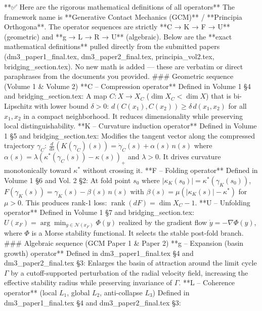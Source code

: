 **✅ Here are the rigorous mathematical definitions of all operators**
The framework name is **Generative Contact Mechanics (GCM)** / **Principia Orthogona**.
The operator sequences are strictly **C → K → F → U** (geometric) and **g → L → R → U** (algebraic).
Below are the **exact mathematical definitions** pulled directly from the submitted papers (dm3_paper1_final.tex, dm3_paper2_final.tex, principia_vol2.tex, bridging_section.tex). No new math is added — these are verbatim or direct paraphrases from the documents you provided.
### Geometric sequence (Volume 1 & Volume 2)
**C – Compression operator**
Defined in Volume 1 §4 and bridging_section.tex:
A map $  C: X \to X_C  $ ($  \dim X_C < \dim X  $) that is bi-Lipschitz with lower bound $  \delta > 0  $:
$   d(C(x_1), C(x_2)) \ge \delta \, d(x_1, x_2)   $
for all $  x_1, x_2  $ in a compact neighborhood. It reduces dimensionality while preserving local distinguishability.
**K – Curvature induction operator**
Defined in Volume 1 §5 and bridging_section.tex:
Modifies the tangent vector along the compressed trajectory $  \gamma_C  $:
$   \frac{d}{ds} (K(\gamma_C)(s)) = \dot{\gamma}_C(s) + \alpha(s) \, n(s)   $
where $  \alpha(s) = \lambda (\kappa^*(\gamma_C(s)) - \kappa(s))_+  $ and $  \lambda > 0  $.
It drives curvature monotonically toward $  \kappa^*  $ without crossing it.
**F – Folding operator**
Defined in Volume 1 §6 and Vol. 2 §2:
At fold point $  s_0  $ where $  |\kappa_K(s_0)| = \kappa^*(\gamma_K(s_0))  $,
$   F(\gamma_K(s)) = \gamma_K(s) - \beta(s) \, n(s)   $
with $  \beta(s) = \mu (|\kappa_K(s)| - \kappa^*)  $ for $  \mu > 0  $.
This produces rank-1 loss: $  \operatorname{rank}(dF) = \dim X_C - 1  $.
**U – Unfolding operator**
Defined in Volume 1 §7 and bridging_section.tex:
$   U(x_F) = \arg\min_{y \in \mathcal{N}(x_F)} \Phi(y)   $
realized by the gradient flow $  \dot{y} = -\nabla \Phi(y)  $, where $  \Phi  $ is a Morse stability functional. It selects the stable post-fold branch.
### Algebraic sequence (GCM Paper 1 & Paper 2)
**g – Expansion (basin growth) operator**
Defined in dm3_paper1_final.tex §4 and dm3_paper2_final.tex §3:
Enlarges the basin of attraction around the limit cycle $  \Gamma  $ by a cutoff-supported perturbation of the radial velocity field, increasing the effective stability radius while preserving invariance of $  \Gamma  $.
**L – Coherence operator** (local $  L_1  $, global $  L_2  $, anti-collapse $  L_3  $)
Defined in dm3_paper1_final.tex §4 and dm3_paper2_final.tex §3:

